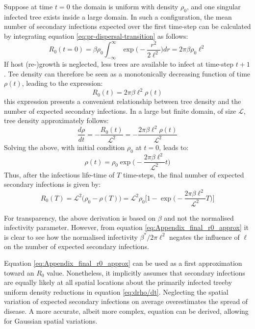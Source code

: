 Suppose at time $t=0$ the domain is uniform with density $\rho_0$, and one singular infected tree exists inside a large domain.
In such a configuration, the mean number of secondary infections expected over the first time-step can be calculated by integrating equation \ref{eq:pr-dispersal-transition} as follows:
\begin{equation}
    R_0(t = 0) = \beta \rho_0 \int^{\infty}_{-\infty} \exp\Big(-\frac{r^2}{2\ell^2}\Big)dr= 2\pi\beta\rho_0\ell^2
\end{equation}
If host (re-)growth is neglected, less trees are available to infect at time-step $t+1$. 
Tee density can therefore be seen as a monotonically decreasing function of time $\rho(t)$, leading to the expression:
\begin{equation}
    R_0(t) = 2\pi\beta\ell^2\rho(t)
    \label{eq:r0-A}
\end{equation}
this expression presents a convenient relationship between tree density and the number of expected secondary infections. 
In a large but finite domain, of size $\mathcal{L}$, tree density approximately follows:
\begin{equation}
\label{eq:drho/dt}
    \frac{d\rho}{dt} = - \frac{R_0(t)}{\mathcal{L}^2} = -\frac{2\pi\beta\ell^2\rho(t)}{\mathcal{L}^2}
\end{equation}
Solving the above, with initial condition $\rho_0$ at $t=0$, leads to:
\begin{equation}
\label{eq:rho(t)-linear}
    \rho(t) = \rho_0 \exp\Big(-\frac{2\pi\beta\ell^2}{\mathcal{L}^2} t \Big)
\end{equation}
Thus, after the infectious life-time of $T$ time-steps, the final number of expected secondary infections is given by:
\begin{equation}
\label{eq:Appendix_final_r0_approx}
    R_0(T) =  \mathcal{L}^2\big(\rho_0 - \rho(T)\big) = \mathcal{L}^2\rho_0\Big[1 - \exp\big(-\frac{2\pi\beta\ell^2}{\mathcal{L}^2} T \big) \Big]
\end{equation}

For transparency, the above derivation is based on $\beta$ and not the normalised infectivity parameter. 
However, from equation \ref{eq:Appendix_final_r0_approx} it is clear to see how the normalised infectivity $\beta^*/2\pi\ell^2$ negates the influence of $\ell$ on the number of expected secondary infections.

Equation \ref{eq:Appendix_final_r0_approx} can be used as a first approximation toward an $R_0$ value.
Nonetheless, it implicitly assumes that secondary infections are equally likely at all spatial locations about the primarily infected tree\textemdash by uniform density reductions in equation \ref{eq:drho/dt}. 
Neglecting the spatial variation of expected secondary infections on average overestimates the spread of disease.
A more accurate, albeit more complex, equation can be derived, allowing for Gaussian spatial variations.

